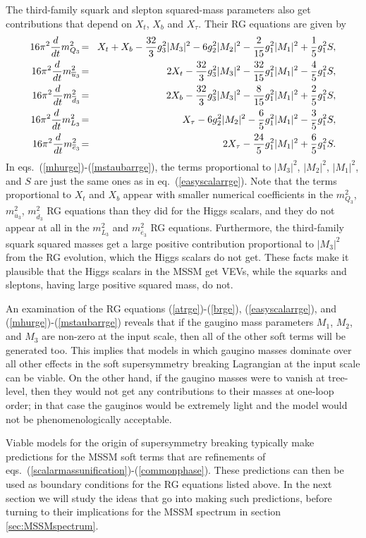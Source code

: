 \documentclass[12pt]{article}
\def\beq{\begin{eqnarray}}
\def\eeq{\end{eqnarray}}
\def\sbar{\overline}
\begin{document}
The third-family squark and slepton squared-mass parameters also get
contributions that depend on $X_t$, $X_b$ and $X_\tau$. Their RG equations
are given by
\beq 
16\pi^2{d\over dt} m_{Q_3}^2 \!&=&\!
X_t +X_b-{32\over 3} g_3^2 |M_3|^2 -6 g_2^2 |M_2|^2 -{2\over 15} g_1^2 |M_1|^2
+ \frac{1}{5} g^{2}_1 S ,
\label{mq3rge} 
\\
16\pi^2 {d\over dt} m_{\sbar u_3}^2 \!&=&\!
2 X_t - {32\over 3} g_3^2 |M_3|^2 - {32\over 15} g_1^2|M_1|^2
- \frac{4}{5} g^{2}_1 S ,
\label{mtbarrge}
\\
16\pi^2 {d\over dt} m_{\sbar d_3}^2 \!&=&\!
2 X_b - {32\over 3} g_3^2 |M_3|^2 - {8\over 15} g_1^2|M_1|^2 
+ \frac{2}{5} g^{2}_1 S ,
\label{md3rge}
\\
16\pi^2 {d\over dt} m_{L_3}^2 \!&=&\!
X_\tau  - 6 g_2^2 |M_2|^2 - {6\over 5} g_1^2 |M_1|^2 - \frac{3}{5} g^{2}_1 S,
\\
16\pi^2 {d\over dt} m_{\sbar e_3}^2 \!&=&\!
2 X_\tau - {24\over 5} g_1^2 |M_1|^2  + \frac{6}{5} g^{2}_1 S .
\label{mstaubarrge}
\eeq
In eqs.~(\ref{mhurge})-(\ref{mstaubarrge}), the terms proportional to
$|M_3|^2$, $|M_2|^2$, $|M_1|^2$, and $S$ are just the same ones as in
eq.~(\ref{easyscalarrge}). Note that the terms proportional to $X_t$ and
$X_b$ appear with smaller numerical coefficients in the $m^2_{Q_3}$,
$m^2_{\sbar u_3}$, $m^2_{\sbar d_3}$ RG equations than they did for the
Higgs scalars, and they do not appear at all in the $m^2_{L_3}$ and
$m^2_{\sbar e_3}$ RG equations. Furthermore, the third-family squark
squared masses get a large positive contribution proportional to $|M_3|^2$
from the RG evolution, which the Higgs scalars do not get. These facts
make it plausible that the Higgs scalars in the MSSM get VEVs, while the
squarks and sleptons, having large positive squared mass, do not. 

An examination of the RG equations (\ref{atrge})-(\ref{brge}),
(\ref{easyscalarrge}), and (\ref{mhurge})-(\ref{mstaubarrge}) reveals that
if the gaugino mass parameters $M_1$, $M_2$, and $M_3$ are non-zero at the
input scale, then all of the other soft terms will be generated too.  This
implies that models in which gaugino masses dominate over all other
effects in the soft supersymmetry breaking Lagrangian at the input scale
can be viable. On the other hand, if the gaugino masses were to vanish at
tree-level, then they would not get any contributions to their masses at
one-loop order; in that case the gauginos would be extremely light and the
model would not be phenomenologically acceptable. 

Viable models for the origin of supersymmetry breaking typically make
predictions for the MSSM soft terms that are refinements of
eqs.~(\ref{scalarmassunification})-(\ref{commonphase}). These predictions
can then be used as boundary conditions for the RG equations listed above. 
In the next section we will study the ideas that go into making such
predictions, before turning to their implications for the MSSM spectrum in
section \ref{sec:MSSMspectrum}. 
\end{document}
